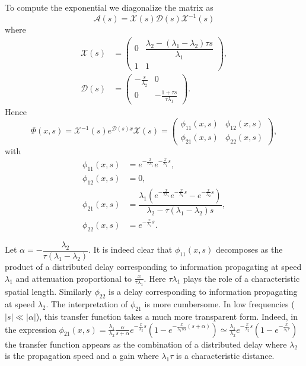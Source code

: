 \documentclass[preprint]{elsarticle}
\begin{document}
To compute the exponential we diagonalize the matrix as 
\begin{equation}
\mathscr{A}(s) = \mathscr{X}(s)\mathscr{D}(s)\mathscr{X}^{-1}(s)
\end{equation} 
where  
\begin{align}
\mathscr{X}(s) &= \begin{pmatrix}
0 & \dfrac{\lambda_2 - (\lambda_1 - \lambda_2) \tau s}{\lambda_1} \\
1 & 1
\end{pmatrix}, \\
\mathscr{D}(s) &= \begin{pmatrix}
-\frac{s}{\lambda_2} & 0 \\
 0 & -\frac{1+\tau s}{\tau \lambda_1}
\end{pmatrix}.
\end{align}
Hence
\begin{equation}
\Phi(x,s) =  \mathscr{X}^{-1}(s)e^{\mathscr{D}(s)x}\mathscr{X}(s) =
\begin{pmatrix}
\phi_{11}(x,s) & \phi_{12}(x,s) \\ 
\phi_{21}(x,s) & \phi_{22}(x,s)
\end{pmatrix},
\end{equation}
with
\begin{subequations} \label{TFv0q0tovxqx}
\begin{align}
\phi_{11}(x,s) &= e^{-\frac{x}{\tau \lambda_1}}e^{-\frac{x}{\lambda_1}s}, \\ 
\phi_{12}(x,s) &= 0, \\
\phi_{21}(x,s) &= \dfrac{\lambda_1 \left( e^{-\frac{x}{\tau \lambda_1}}e^{-\frac{x}{\lambda_1}s} - e^{-\frac{x}{\lambda_2}s}\right)}{\lambda_2 - \tau (\lambda_1 - \lambda_2)s}, \\
\phi_{22}(x,s) &= e^{-\frac{x}{\lambda_2}s}.
\end{align}
\end{subequations}


Let $\alpha = -\dfrac{\lambda_2}{\tau(\lambda_1 - \lambda_2)}$. It is indeed clear that $\phi_{11}\left(x,s\right)$ decomposes as the product of a distributed delay corresponding to information propagating at speed $\lambda_{1}$ and attenuation proportional to $\frac{x}{\tau\lambda_{1}}$. Here $\tau\lambda_{1}$ plays the role of a characteristic spatial length. Similarly $\phi_{22}$ is a delay corresponding to information propagating at speed $\lambda_{2}$. The interpretation of $\phi_{21}$ is more cumbersome. In low frequencies ($\left|s\right|\ll\left|\alpha\right|$), this transfer function takes a much more transparent form. Indeed, in the expression
$
\phi_{21}(x,s) = 
\frac{\lambda_{1}}{\lambda_{2}}\frac{\alpha}
{s + \alpha}
e^{-\frac{x}{\lambda_2}s}
	\left(
		1 - e^{-\frac{x}{\lambda_1 \tau \alpha}\left(s + \alpha\right)}
	\right)
\simeq \frac{\lambda_{1}}{\lambda_{2}} e^{-\frac{x}{\lambda_2}s}
	\left(
		1 - e^{-\frac{x}{\lambda_1 \tau}}
	\right)
$
the transfer function appears as the combination of a distributed delay where $\lambda_{2}$ is the propagation speed and a gain where $\lambda_{1}\tau$ is a characteristic distance.
\end{document}
